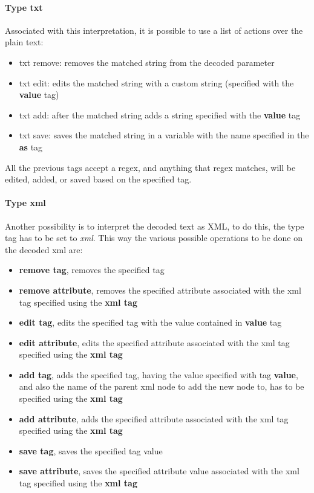 \paragraph{Type txt}
Associated with this interpretation, it is possible to use a list of actions over the plain text:
\begin{itemize}
    \item txt remove: removes the matched string from the decoded parameter
    \item txt edit: edits the matched string with a custom string (specified with the \textbf{value} tag)
    \item txt add: after the matched string adds a string specified with the \textbf{value} tag
    \item txt save: saves the matched string in a variable with the name specified in the \textbf{as} tag
\end{itemize}
All the previous tags accept a regex, and anything that regex matches, will be edited, added, or saved based on the specified tag.

\paragraph{Type xml}
Another possibility is to interpret the decoded text as XML, to do this, the type tag has to be set to \textit{xml}.
This way the various possible operations to be done on the decoded xml are:
\begin{itemize}
    \item \textbf{remove tag}, removes the specified tag
    \item \textbf{remove attribute}, removes the specified attribute associated with the xml tag specified using the \textbf{xml tag}
    \item \textbf{edit tag}, edits the specified tag with the value contained in \textbf{value} tag 
    \item \textbf{edit attribute}, edits the specified attribute associated with the xml tag specified using the \textbf{xml tag}
    \item \textbf{add tag}, adds the specified tag, having the value specified with tag \textbf{value}, and also the name of the parent xml node to add the new node to, has to be specified using the \textbf{xml tag}
    \item \textbf{add attribute}, adds the specified attribute associated with the xml tag specified using the \textbf{xml tag}
    \item \textbf{save tag}, saves the specified tag value
    \item \textbf{save attribute}, saves the specified attribute value associated with the xml tag specified using the \textbf{xml tag}
\end{itemize}

